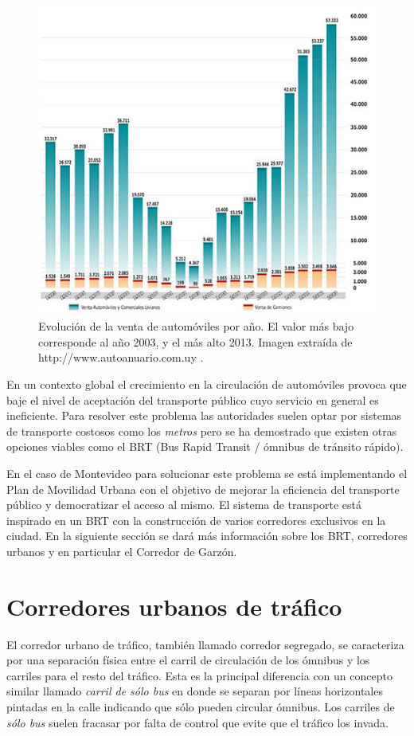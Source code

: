 \begin{figure}[H]
	\centering
	\includegraphics[width=0.9\linewidth]{Figures/ventas_autos}
	\caption[Evolución de la venta de automóviles en Uruguay]{Evolución de la venta de automóviles por año. El valor más bajo corresponde al año 2003, y el más alto 2013. Imagen extraída de {http://www.autoanuario.com.uy} .	
	}
	\label{fig:ventas_autos}
\end{figure}

En un contexto global el crecimiento en la circulación de automóviles provoca que baje el nivel de aceptación del transporte público cuyo servicio en general es ineficiente. Para resolver este problema las autoridades suelen optar por sistemas de transporte costosos como los \emph{metros} pero se ha demostrado que existen otras opciones viables como el BRT (Bus Rapid Transit / ómnibus de tránsito rápido)\citep{BRT_Dial}.

En el caso de Montevideo para solucionar este problema se está implementando el Plan de Movilidad Urbana \citep{PlanMovilidad} con el objetivo de mejorar la eficiencia del transporte público y democratizar el acceso al mismo. El sistema de transporte está inspirado en un BRT con la construcción de varios corredores exclusivos en la ciudad. En la siguiente sección se dará más información sobre los BRT, corredores urbanos y en particular el Corredor de Garzón.

\section{Corredores urbanos de tráfico}
El corredor urbano de tráfico, también llamado corredor segregado, se caracteriza por una separación física entre el carril de circulación de los ómnibus y los carriles para el resto del tráfico. 
Esta es la principal diferencia con un concepto similar llamado \emph{carril de sólo bus} en donde se separan por líneas horizontales pintadas en la calle indicando que sólo pueden circular ómnibus. Los carriles de \emph{sólo bus} suelen fracasar por falta de control que evite que el tráfico los invada. 


